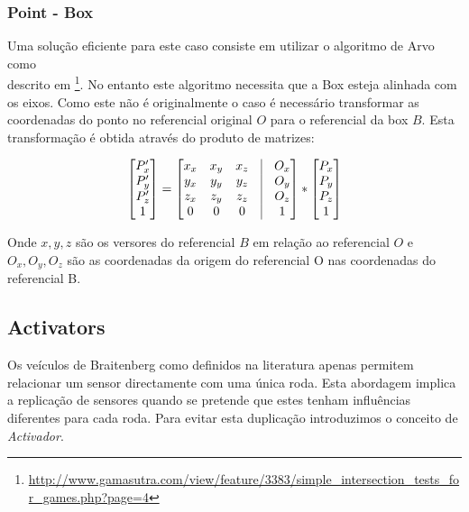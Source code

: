 \documentclass[a4paper]{article}
\begin{document}
\subsubsection{Point - Box}
\indent \indent Uma solução eficiente para este caso consiste em utilizar o algoritmo de Arvo como \\ descrito em  \footnote[1]{\url{http://www.gamasutra.com/view/feature/3383/simple_intersection_tests_for_games.php?page=4}}.
No entanto este algoritmo necessita que a Box esteja alinhada com os eixos.
Como este não é originalmente o caso é necessário transformar as coordenadas do ponto no referencial original $O$ para o referencial da box $B$.
Esta transformação é obtida através do produto de matrizes:

\[
 	\begin{bmatrix}
		P_{x}' \\
		P_{y}' \\
		P_{z}' \\
		1 
	\end{bmatrix}
	=
	\begin{bmatrix}
		x_{x} & x_{y} & x_{z} & \vline & O_{x}	\\
		y_{x} & y_{y} & y_{z} & \vline & O_{y}	\\
		z_{x} & z_{y} & z_{z} & \vline & O_{z}	\\
		0 & 0 & 0 & \vline & 1 	\\
	\end{bmatrix}
	*
 	\begin{bmatrix}
		P_{x} \\
		P_{y} \\
		P_{z} \\
		1 
	\end{bmatrix}
\]

Onde $x, y, z$ são os versores do referencial $B$ em relação ao referencial $O$ e $O_{x}, O_{y}, O_{z}$ são as coordenadas da origem do referencial O nas coordenadas do referencial B. 

\cleardoublepage
\subsection{Activators}
\indent \indent Os veículos de Braitenberg como definidos na literatura apenas permitem relacionar um sensor directamente com uma única roda.
Esta abordagem implica a replicação de sensores quando se pretende que estes tenham influências diferentes para cada roda.
Para evitar esta duplicação introduzimos o conceito de \emph{Activador}. 
\end{document}
